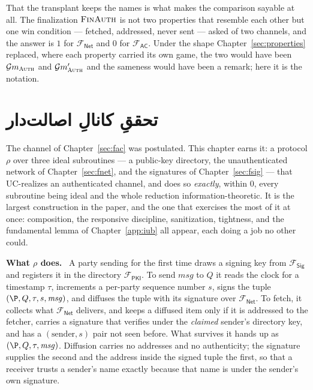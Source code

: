 \documentclass[10pt,oneside,openany]{book}
\newcommand{\op}[1]{\textnormal{\textsc{#1}}}
\newcommand{\Gm}{\mathcal{G}m}
\newcommand{\Fsig}{\mathcal{F}_{\mathsf{Sig}}}
\newcommand{\Fnet}{\mathcal{F}_{\mathsf{Net}}}
\newcommand{\Fac}{\mathcal{F}_{\mathsf{AC}}}
\newcommand{\Fpki}{\mathcal{F}_{\mathsf{PKI}}}
\newcommand{\msg}{\mathit{msg}}
\newcommand{\heading}[1]{\medskip\par\noindent\textcolor{accent}{\textbf{#1.}}\ }
\theoremstyle{accentdef}
\theoremstyle{accentplain}
\begin{document}
That the transplant keeps the names is what makes the comparison sayable at all. The finalization $\op{FinAuth}$
is not two properties that resemble each other but one win condition --- fetched, addressed, never
sent --- asked of two channels, and the answer is $1$ for $\Fnet$ and $0$ for $\Fac$. Under the
shape Chapter~\ref{sec:properties} replaced, where each property carried its own game, the two
would have been $\Gm_{\op{Auth}}$ and $\Gm_{\op{Auth}}'$ and the sameness would have been a remark;
here it is the notation.

\chapter{تحققِ کانالِ اصالت‌دار}\label{sec:realac}

The channel of Chapter~\ref{sec:fac} was postulated. This chapter earns it: a protocol $\rho$
over three ideal subroutines --- a public-key directory, the unauthenticated network of
Chapter~\ref{sec:fnet}, and the signatures of Chapter~\ref{sec:fsig} --- that UC-realizes an
authenticated channel, and does so \emph{exactly}, within $0$, every subroutine being ideal and
the whole reduction information-theoretic. It is the largest construction in the paper, and the
one that exercises the most of it at once: composition, the responsive discipline, sanitization,
tightness, and the fundamental lemma of Chapter~\ref{app:iub} all appear, each doing a job no
other could.

\heading{What $\rho$ does} A party sending for the first time draws a signing key from $\Fsig$ and
registers it in the directory $\Fpki$. To send $\msg$ to $Q$ it reads the clock for a timestamp
$\tau$, increments a per-party sequence number $s$, signs the tuple $(\P,Q,\tau,s,\msg)$, and
diffuses the tuple with its signature over $\Fnet$. To fetch, it collects what $\Fnet$ delivers,
and keeps a diffused item only if it is addressed to the fetcher, carries a signature that
verifies under the \emph{claimed} sender's directory key, and has a $(\text{sender},s)$ pair not
seen before. What survives it hands up as $(\P,Q,\tau,\msg)$. Diffusion carries no addresses and
no authenticity; the signature supplies the second and the address inside the signed tuple the
first, so that a receiver trusts a sender's name exactly because that name is under the sender's
own signature.
\end{document}
